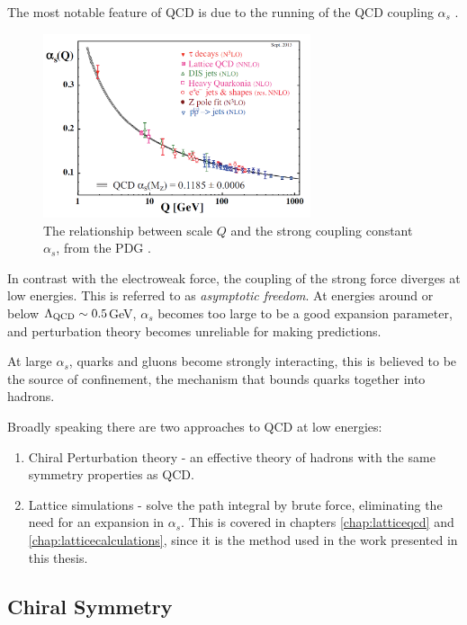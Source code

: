 The most notable feature of QCD is due to the running of the QCD coupling $\alpha_s$ \cite{PhysRevLett.30.1343}.
\begin{figure}
  \begin{center}
    \includegraphics[width=0.7\textwidth]{images/QCD-running-coupling.png}
  \end{center}
  \caption{The relationship between scale $Q$ and the strong coupling constant $\alpha_s$, from the PDG \cite{PhysRevD.98.030001}.}
  \label{fig:alpha_s}
\end{figure}
In contrast with the electroweak force, the coupling of the strong force diverges at low energies. This is referred to as {\it{asymptotic freedom}}. At energies around or below $\Lambda_{\text{QCD}} \sim 0.5$GeV, $\alpha_s$ becomes too large to be a good expansion parameter, and perturbation theory becomes unreliable for making predictions.

At large $\alpha_s$, quarks and gluons become strongly interacting, this is believed to be the source of confinement, the mechanism that bounds quarks together into hadrons. %

Broadly speaking there are two approaches to QCD at low energies:
\begin{enumerate}
\item
  Chiral Perturbation theory - an effective theory of hadrons with the same symmetry properties as QCD.
\item
  Lattice simulations - solve the path integral by brute force, eliminating the need for an expansion in $\alpha_s$. This is covered in chapters \ref{chap:latticeqcd} and \ref{chap:latticecalculations}, since it is the method used in the work presented in this thesis.
\end{enumerate}

\subsection{Chiral Symmetry}
\label{sec:chiralsymmetry}

